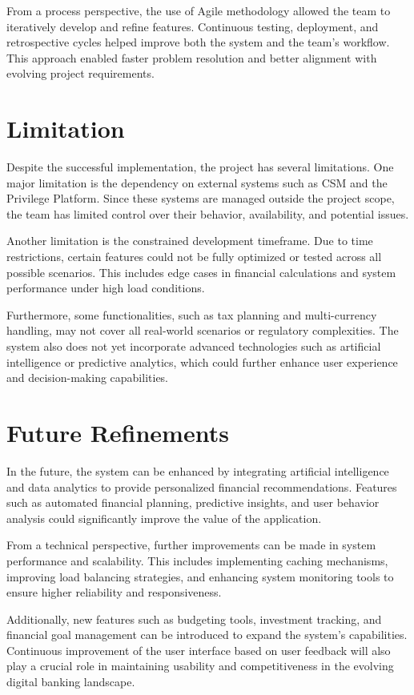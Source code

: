 \documentclass[12pt,oneside,openright,a4paper]{cpe-english-project}
\begin{document}
From a process perspective, the use of Agile methodology allowed the
team to iteratively develop and refine features. Continuous testing,
deployment, and retrospective cycles helped improve both the system and
the team's workflow. This approach enabled faster problem resolution and
better alignment with evolving project requirements.

\section{Limitation}

Despite the successful implementation, the project has several
limitations. One major limitation is the dependency on external systems
such as CSM and the Privilege Platform. Since these systems are managed
outside the project scope, the team has limited control over their
behavior, availability, and potential issues.

Another limitation is the constrained development timeframe. Due to time
restrictions, certain features could not be fully optimized or tested
across all possible scenarios. This includes edge cases in financial
calculations and system performance under high load conditions.

Furthermore, some functionalities, such as tax planning and
multi-currency handling, may not cover all real-world scenarios or
regulatory complexities. The system also does not yet incorporate
advanced technologies such as artificial intelligence or predictive
analytics, which could further enhance user experience and
decision-making capabilities.

\section{Future Refinements}

In the future, the system can be enhanced by integrating artificial
intelligence and data analytics to provide personalized financial
recommendations. Features such as automated financial planning,
predictive insights, and user behavior analysis could significantly
improve the value of the application.

From a technical perspective, further improvements can be made in system
performance and scalability. This includes implementing caching
mechanisms, improving load balancing strategies, and enhancing system
monitoring tools to ensure higher reliability and responsiveness.

Additionally, new features such as budgeting tools, investment tracking,
and financial goal management can be introduced to expand the system's
capabilities. Continuous improvement of the user interface based on user
feedback will also play a crucial role in maintaining usability and
competitiveness in the evolving digital banking landscape.

\hfill\break


\nocite{*}

\end{document}
